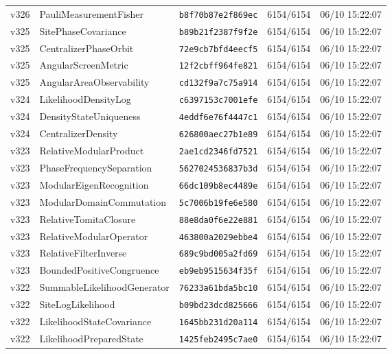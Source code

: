 \documentclass[11pt]{article}
\theoremstyle{definition}\newtheorem{deriv}{Derivation}
\begin{document}
{\begin{longtable}{@{}lllll@{}}
v326 & PauliMeasurementFisher & \texttt{b8f70b87e2f869ec} & 6154/6154 & 06/10 15:22:07 \\
v325 & SitePhaseCovariance & \texttt{b89b21f2387f9f2e} & 6154/6154 & 06/10 15:22:07 \\
v325 & CentralizerPhaseOrbit & \texttt{72e9cb7bfd4eecf5} & 6154/6154 & 06/10 15:22:07 \\
v325 & AngularScreenMetric & \texttt{12f2cbff964fe821} & 6154/6154 & 06/10 15:22:07 \\
v325 & AngularAreaObservability & \texttt{cd132f9a7c75a914} & 6154/6154 & 06/10 15:22:07 \\
v324 & LikelihoodDensityLog & \texttt{c6397153c7001efe} & 6154/6154 & 06/10 15:22:07 \\
v324 & DensityStateUniqueness & \texttt{4eddf6e76f4447c1} & 6154/6154 & 06/10 15:22:07 \\
v324 & CentralizerDensity & \texttt{626800aec27b1e89} & 6154/6154 & 06/10 15:22:07 \\
v323 & RelativeModularProduct & \texttt{2ae1cd2346fd7521} & 6154/6154 & 06/10 15:22:07 \\
v323 & PhaseFrequencySeparation & \texttt{5627024536837b3d} & 6154/6154 & 06/10 15:22:07 \\
v323 & ModularEigenRecognition & \texttt{66dc109b8ec4489e} & 6154/6154 & 06/10 15:22:07 \\
v323 & ModularDomainCommutation & \texttt{5c7006b19fe6e580} & 6154/6154 & 06/10 15:22:07 \\
v323 & RelativeTomitaClosure & \texttt{88e8da0f6e22e881} & 6154/6154 & 06/10 15:22:07 \\
v323 & RelativeModularOperator & \texttt{463800a2029ebbe4} & 6154/6154 & 06/10 15:22:07 \\
v323 & RelativeFilterInverse & \texttt{689c9bd005a2fd69} & 6154/6154 & 06/10 15:22:07 \\
v323 & BoundedPositiveCongruence & \texttt{eb9eb9515634f35f} & 6154/6154 & 06/10 15:22:07 \\
v322 & SummableLikelihoodGenerator & \texttt{76233a61bda5bc10} & 6154/6154 & 06/10 15:22:07 \\
v322 & SiteLogLikelihood & \texttt{b09bd23dcd825666} & 6154/6154 & 06/10 15:22:07 \\
v322 & LikelihoodStateCovariance & \texttt{1645bb231d20a114} & 6154/6154 & 06/10 15:22:07 \\
v322 & LikelihoodPreparedState & \texttt{1425feb2495c7ae0} & 6154/6154 & 06/10 15:22:07 \\

\end{longtable}}
\end{document}
